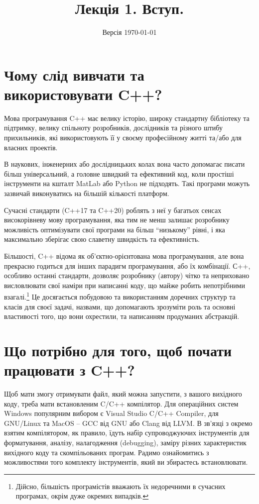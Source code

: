 \documentclass[12pt]{article}
\title{Лекція 1. Вступ.}
\author{}
\date{Версія \today}
\begin{document}
	\maketitle
	
	\tableofcontents
	
	\section{Чому слід вивчати та використовувати C++?}

	Мова програмування C++ має велику історію, широку стандартну бібліотеку та підтримку, велику спільноту розробників, дослідників та різного штибу прихильників, які використовують її у своєму професійному житті та/або для власних проектів.

	В наукових, інженерних або дослідницьких колах вона часто допомагає писати більш універсальний, а головне швидкий та ефективний код, коли простіші інструменти на кшталт MatLab або Python не підходять. Такі програми можуть зазвичай виконуватись на більшій кількості платформ.

	Сучасні стандарти (C++17 та C++20) роблять з неї у багатьох сенсах високорівневу мову програмування, яка тим не менш залишає розробнику можливість оптимізувати свої програми на більш ``низькому'' рівні, і яка максимально зберігає свою славетну швидкість та ефективність.

	Більшості, C++ відома як об'єктно-орієнтована мова програмування, але вона прекрасно годиться для інших парадигм програмування, або їх комбінації. С++, особливо останні стандарти, дозволяє розробнику (автору) чітко та неприховано висловлювати свої наміри при написанні коду, що майже робить непотрібними взагалі.\footnote{Дійсно, більшість програмістів вважають їх недоречними в сучасних програмах, окрім дуже окремих випадків.}
	Це досягається побудовою та використанням доречних структур та класів для своєї задачі, назвами, що допомагають зрозуміти роль та основні властивості того, що вони охрестили, та написанням продуманих абстракцій.

	\section{Що потрібно для того, щоб почати працювати з C++?}
	Щоб мати змогу отримувати файл, який можна запустити, з вашого вихідного коду, треба мати встановленим C/C++ компілятор. Для операційних систем Windows популярним вибором є Visual Studio C/C++ Compiler, для GNU/Linux та MacOS -- GCC від GNU або Clang від LLVM. В зв'язці з окремо взятим компілятором, як правило, їдуть набір супроводжуючих інструментів для форматування, аналізу, налагодження (debugging), заміру різних характеристик вихідного коду та скомпільованих програм. Радимо ознайомитись з можливостями того комплекту інструментів, який ви збираєтесь встановлювати.
	
\end{document}
